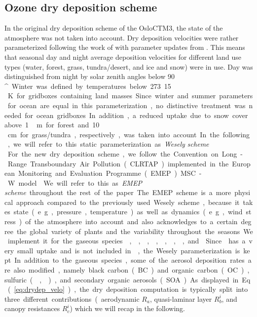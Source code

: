 \documentclass[gmd, manuscript]{copernicus}
\begin{document}
\subsection{Ozone dry deposition scheme}
\label{subsec:DryDep}
In the original dry deposition scheme of the OsloCTM3, the state of the atmosphere was not taken into account. Dry deposition velocities were rather parameterized following the work of \citet{AE:Wesely1989} with parameter updates from \citet{JGR:Hough1991}. This means that seasonal day and night average deposition velocities for different land use types (water, forest, grass, tundra/desert, and ice and snow) were in use. Day was distinguished from night by solar zenith angles below 90\,\unit{^\circ}. Winter was defined by temperatures below 273.15\,\unit{K} for gridboxes containing land masses. Since winter and summer parameters for ocean are equal in this parameterization, no distinctive treatment was needed for ocean gridboxes. In addition, a reduced uptake due to snow cover above 1\,\unit{m} for forest and 10\,\unit{cm} for grass/tundra, respectively, was taken into account. In the following, we will refer to this static parameterization as \emph{Wesely scheme}.\\

For the new dry deposition scheme, we follow the Convention on Long-Range Transboundary Air Pollution (CLRTAP) implemented in the European Monitoring and Evaluation Programme (EMEP) MSC-W model \citep{WASP:Simpson2003,ACP:Simpson2012}. We will refer to this as \emph{EMEP scheme} throughout the rest of the paper. The EMEP scheme is a more physical approach compared to the previously used Wesely scheme, because it takes state (e.g., pressure, temperature) as well as dynamics (e.g., wind stress) of the atmosphere into account and also acknowledges to a certain degree the global variety of plants and the variability throughout the seasons. We implement it for the gaseous species , , , , , , , and . Since  has a very small uptake and is not included in \citet{WASP:Simpson2003,ACP:Simpson2012}, the Wesely parameterization is kept. In addition to the gaseous species, some of the aerosol deposition rates are also modified, namely black carbon (BC) and organic carbon (OC), sulfuric (, ), and secondary organic aerosols (SOA). As displayed in Eq.~(\ref{eq:drydep_velo}), the dry deposition computation is typically split into three different contributions (aerodynamic $R_a$, quasi-laminar layer $R^i_b$, and canopy resistances $R^i_c$) which we will recap in the following.
\end{document}
